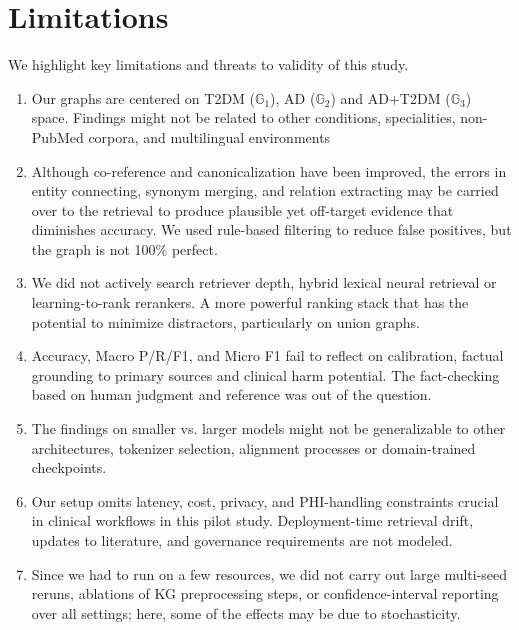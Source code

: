\section{Limitations}
\label{sec:limitations}
\noindent We highlight key limitations and threats to validity of this study.

\begin{enumerate}
    \item Our graphs are centered on T2DM ($\mathbb{G}_1$), AD ($\mathbb{G}_2$) and AD+T2DM ($\mathbb{G}_3$) space. Findings might not be related to other conditions, specialities, non-PubMed corpora, and multilingual environments

    \item Although co-reference and canonicalization have been improved, the errors in entity connecting, synonym merging, and relation extracting may be carried over to the retrieval to produce plausible yet off-target evidence that diminishes accuracy. We used rule-based filtering to reduce false positives, but the graph is not 100\% perfect.


    \item We did not actively search retriever depth, hybrid lexical neural retrieval or learning-to-rank rerankers. A more powerful ranking stack that has the potential to minimize distractors, particularly on union graphs.

    \item Accuracy, Macro P/R/F1, and Micro F1 fail to reflect on calibration, factual grounding to primary sources and clinical harm potential. The fact-checking based on human judgment and reference was out of the question.


    \item The findings on smaller vs. larger models might not be generalizable to other architectures, tokenizer selection, alignment processes or domain-trained checkpoints.

    \item Our setup omits latency, cost, privacy, and PHI-handling constraints crucial in clinical workflows in this pilot study. Deployment-time retrieval drift, updates to literature, and governance requirements are not modeled.

    \item Since we had to run on a few resources, we did not carry out large multi-seed reruns, ablations of KG preprocessing steps, or confidence-interval reporting over all settings; here, some of the effects may be due to stochasticity.
\end{enumerate}
